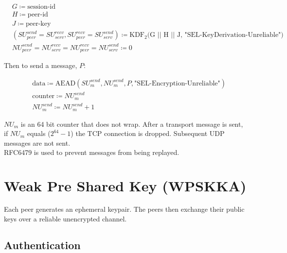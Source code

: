\documentclass{article}
\begin{document}
    \begin{align*}
        &  G\coloneqq \text{session-id}                                                               \\
        &  H \coloneqq \text{peer-id}                                                                \\
        &  J \coloneqq \text{peer-key}                                                              \\
        &  (\mathit{SU}_{peer}^{send} = \mathit{SU}_{serv}^{recv}, \mathit{SU}_{peer}^{recv} = \mathit{SU}_{serv}^{send})
        \coloneqq \text{KDF}_2\text{(G || H || J, "SEL-KeyDerivation-Unreliable")}
        \\
        &   \mathit{NU}_{peer}^{send} = \mathit{NU}_{serv}^{recv} = \mathit{NU}_{peer}^{recv} = \mathit{NU}_{serv}^{send} \coloneqq 0
    \end{align*}

    Then to send a message, $P$:

    \begin{align*}
        & \text{data} \coloneqq \text{AEAD}(\mathit{SU}_{m}^{send}, \mathit{NU}_{m}^{send}, P,
        \text{"SEL-Encryption-Unreliable"})\\
        & \text{counter} \coloneqq \mathit{NU}_{m}^{send}\\
        & \mathit{NU}_{m}^{send} \coloneqq \mathit{NU}_{m}^{send} + 1
    \end{align*}


    $\mathit{NU}_{m}$ is an 64 bit counter that does not wrap.
    After a transport message is sent, if $\mathit{NU}_{m}$ equals
    ($2^{64}-1$) the TCP connection is dropped.
    Subsequent UDP messages are not sent.\\

    RFC6479 is used to prevent messages from being replayed.


    \section{Weak Pre Shared Key (WPSKKA)}

    Each peer generates an ephemeral keypair.
    The peers then exchange their public keys over a reliable unencrypted channel.

    \subsection{Authentication}
\end{document}
